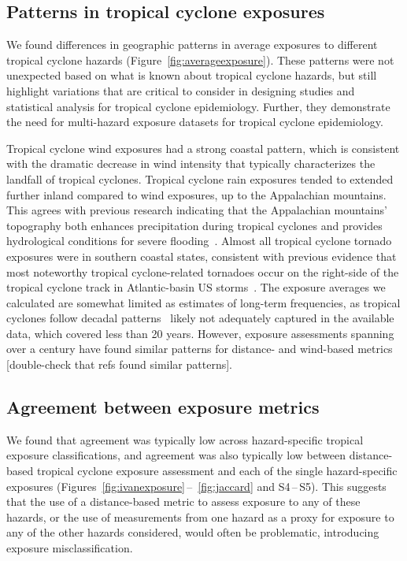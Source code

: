 \subsection*{Patterns in tropical cyclone exposures}

We found differences in geographic patterns in average exposures to different
tropical cyclone hazards (Figure~\ref{fig:averageexposure}). These patterns
were not unexpected based on what is known about tropical cyclone hazards, but
still highlight variations that are critical to consider in designing studies
and statistical analysis for tropical cyclone epidemiology. Further, they
demonstrate the need for multi-hazard exposure datasets for tropical cyclone
epidemiology. 

Tropical cyclone wind exposures had a strong coastal pattern, which is
consistent with the dramatic decrease in wind intensity that typically
characterizes the landfall of tropical cyclones.  Tropical cyclone rain
exposures tended to extended further inland compared to wind exposures, up to
the Appalachian mountains. This agrees with previous research indicating that
the Appalachian mountains' topography both enhances precipitation during
tropical cyclones and provides hydrological conditions for severe
flooding~\parencite{rees2001}.  Almost all tropical cyclone tornado exposures
were in southern coastal states, consistent with previous evidence that most noteworthy
tropical cyclone-related tornadoes occur on the right-side of the tropical
cyclone track in Atlantic-basin \ac{US} storms~\parencite{moore2012}.  The
exposure averages we calculated are somewhat limited as estimates of long-term
frequencies, as tropical cyclones follow decadal
patterns~\parencite{kossin2007more} likely not adequately captured in the
available data, which covered less than 20 years. However, exposure assessments
spanning over a century have found similar patterns for distance- and
wind-based metrics~\textcite{zandbergen2009, kruk2010} [double-check that refs
found similar patterns].

\subsection*{Agreement between exposure metrics}

We found that agreement was typically low across hazard-specific tropical
exposure classifications, and agreement was also typically low between
distance-based tropical cyclone exposure assessment and each of the single
hazard-specific exposures (Figures~\ref{fig:ivanexposure}\,--\,
\ref{fig:jaccard} and S4\,--\,S5). This suggests that the use of a
distance-based metric to assess exposure to any of these hazards, or the use of
measurements from one hazard as a proxy for exposure to any of the other
hazards considered, would often be problematic, introducing exposure
misclassification.

